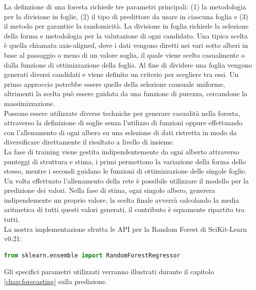 \documentclass[%
    corpo=12pt,
    twoside,
    oldstyle,
    autoretitolo,
    greek,
    evenboxes,
]{toptesi}
\begin{document}
La definzione di una foresta richiede tre parametri principali: (1) la metodologia per la divisione in foglie, (2) il tipo di predittore da usare in ciascuna foglia e (3) il metodo per garantire la randomicità.
La divisione in foglia richiede la selezione della forma e metodologia per la valutazione di ogni candidato. Una tipica scelta è quella chiamata axis-aligned, dove i dati vengono diretti nei vari sotto alberi in base al passaggio o meno di un valore soglia, il quale viene scelto casualmente o dalla funzione di ottimizzazione della foglia. Al fine di dividere una foglia vengono generati diversi candidati e viene definito un criterio per scegliere tra essi. Un primo approccio potrebbe essere quello della selezione causuale uniforme, altrimenti la scelta può essere guidata da una funzione di purezza, cercandone la massimizzazione.\\
Possono essere utilizzate diverse techniche per generare casualità nella foresta, attraverso la definizione di soglie senza l'utilizzo di funzioni oppure effettuando con l'allenamento di ogni albero su una selezione di dati ristretta in modo da diversificare direttamente il risultato a livello di insieme.\\
La fase di training viene gestita indipendentemente da ogni alberto attraverso punteggi di struttura e stima, i primi permettono la variazione della forma dello stesso, mentre i secondi guidano le funzioni di ottimizzazione delle singole foglie.\\
Un volta effettuato l'allenamento della rete è possibile utilizzare il modello per la predizione dei valori. Nella fase di stima, ogni singolo albero, generera indipendemente un proprio valore, la scelta finale avverrà calcolando la media aritmetica di tutti questi valori generati, il contributo è equamente ripartito tra tutti.\\
La nostra implementazione sfrutta le API per la Random Forest di SciKit-Learn v0.21:
\begin{lstlisting}[language=python, frame=single]
  from sklearn.ensemble import RandomForestRegressor
\end{lstlisting}
Gli specifici parametri utilizzati verranno illustrati durante il capitolo \ref{chap:forecasting} sulla predizione.
\end{document}
